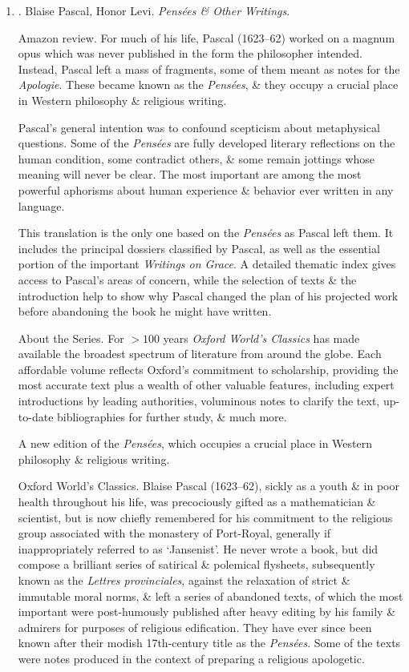 \documentclass{article}
\begin{document}
\begin{enumerate}
	\item \cite{Pascal_pensees_other_writings}. {\sc Blaise Pascal, Honor Levi}. {\it Pens\'ees \& Other Writings}. {}
	
	{\sf Amazon review.} For much of his life, {\sc Pascal} (1623--62) worked on a magnum opus which was never published in the form the philosopher intended. Instead, {\sc Pascal} left a mass of fragments, some of them meant as notes for the {\it Apologie}. These became known as the {\it Pens\'ees}, \& they occupy a crucial place in Western philosophy \& religious writing.
	
	{\sc Pascal}'s general intention was to confound scepticism about metaphysical questions. Some of the {\it Pens\'ees} are fully developed literary reflections on the human condition, some contradict others, \& some remain jottings whose meaning will never be clear. The most important are among the most powerful aphorisms about human experience \& behavior ever written in any language.
	
	This translation is the only one based on the {\it Pens\'ees} as {\sc Pascal} left them. It includes the principal dossiers classified by {\sc Pascal}, as well as the essential portion of the important {\it Writings on Grace}. A detailed thematic index gives access to {\sc Pascal}'s areas of concern, while the selection of texts \& the introduction help to show why {\sc Pascal} changed the plan of his projected work before abandoning the book he might have written.
	
	{\sf About the Series.} For $>100$ years {\it Oxford World's Classics} has made available the broadest spectrum of literature from around the globe. Each affordable volume reflects Oxford's commitment to scholarship, providing the most accurate text plus a wealth of other valuable features, including expert introductions by leading authorities, voluminous notes to clarify the text, up-to-date bibliographies for further study, \& much more.
	
	A new edition of the {\it Pensées}, which occupies a crucial place in Western philosophy \& religious writing. 
	
	{\sf Oxford World's Classics.} {\sc Blaise Pascal} (1623--62), sickly as a youth \& in poor health throughout his life, was precociously gifted as a mathematician \& scientist, but is now chiefly remembered for his commitment to the religious group associated with the monastery of Port-Royal, generally if inappropriately referred to as `Jansenist'. He never wrote a book, but did compose a brilliant series of satirical \& polemical flysheets, subsequently known as the {\it Lettres provinciales}, against the relaxation of strict \& immutable moral norms, \& left a series of abandoned texts, of which the most important were post-humously published after heavy editing by his family \& admirers for purposes of religious edification. They have ever since been known after their modish 17th-century title as the {\it Pens\'ees}. Some of the texts were notes produced in the context of preparing a religious apologetic.
	

\end{enumerate}
\end{document}
